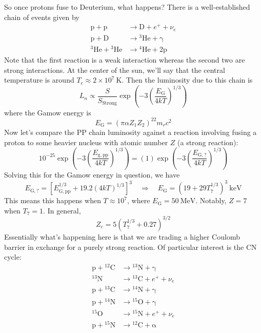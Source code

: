 \documentclass[10pt]{article}
\numberwithin{equation}{section}
\begin{document}
  So once protons fuse to Deuterium, what happens? There is a
  well-established chain of events given by
  \begin{align}
    \label{eq:164}
    \mathrm{p+p}&\to \mathrm{D+}e^++\nu_e\\
    \label{eq:164a}
    \mathrm{p+D} &\to\mathrm{{}^3He+\gamma}\\
    \label{eq:164b}
    \mathrm{{}^3He+{}^3He}&\to \mathrm{{}^4He+2p}
  \end{align}
  Note that the first reaction is a weak interaction whereas the
  second two are strong interactions. At the center of the sun, we'll
  say that the central temperature is around $T_c\approx 2\times 10^7\
  \mathrm{K}$. Then the luminosity due to this chain is
  \begin{equation}
    \label{eq:165}
    L_n\propto \frac{S}{S_{\mathrm{Strong}}}\exp\left(-3\left(\frac{E_
\mathrm{G}}{4kT}\right)^{1/3}\right)
  \end{equation}
  where the Gamow energy is
  \begin{equation}
    \label{eq:166}
    E_{\mathrm{G}}=\left(\pi\alpha Z_1Z_2\right)^22m_rc^2
  \end{equation}
  Now let's compare the PP chain luminosity against a reaction
  involving fusing a proton to some heavier nucleus with atomic number
  $Z$ (a strong reaction):
  \begin{equation}
    \label{eq:167}
    10^{-25}\exp\left(-3\left(\frac{E_{\mathrm{g,pp}}}{4kT}\right)^
{1/3}\right)=(1)\exp\left(-3\left(\frac{E_{\mathrm{G,?}}}{4kT}\right)^
{1/3}\right)
  \end{equation}
  Solving this for the Gamow energy in question, we have
  \begin{equation}
    \label{eq:168}
    E_{\mathrm{G,?}}=\left[E_{\mathrm{G,pp}}^{1/3}+19.2(4kT)^{1/3}\right]^
{3}\quad
    \Rightarrow \quad E_{\mathrm{G}}=\left(19+29 T_7^{1/3}\right)^{3}\ 
\mathrm{keV}
  \end{equation}
  This means this happens when $T\approx 10^7$, where
  $E_{\mathrm{G}}=50\ \mathrm{MeV}$. Notably, $Z=7$ when $T_7=1$. In
  general, 
  \begin{equation}
    \label{eq:169}
    \boxed{Z_c=5\left(T_7^{1/3}+0.27\right)^{3/2}}
  \end{equation}
  Essentially what's happening here is that we are trading a higher
  Coulomb barrier in exchange for a purely strong reaction. Of
  particular interest is the CN cycle:
  \begin{align}
    \label{eq:170}
    \mathrm{p+{}^{12}C} & \to \mathrm{{}^{13}N+\gamma}\\
    \label{eq:170a}
    \mathrm{{}^{13}N} & \to \mathrm{{}^{13}C+}e^++\nu_e\\
    \label{eq:170b}
    \mathrm{p+{}^{13}C} &\to \mathrm{{}^{14}N+\gamma}\\
    \label{eq:170c}
    \mathrm{p+{}^{14}N} &\to \mathrm{{}^{15}O+\gamma}\\
    \label{eq:170d}
    \mathrm{{}^{15}O} &\to\mathrm{{}^{15}N}+e^++\nu_e\\
    \label{eq:170e}
    \mathrm{p+{}^{15}N} &\to\mathrm{{}^{12}C+\alpha}
  \end{align}
\end{document}
